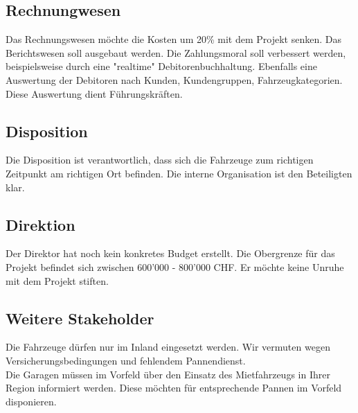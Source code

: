 \subsection{Rechnungwesen}
Das Rechnungswesen möchte die Kosten um 20\% mit dem Projekt senken. Das Berichtswesen soll ausgebaut werden. Die Zahlungsmoral soll verbessert werden, beispielsweise durch eine "realtime" Debitorenbuchhaltung. Ebenfalls eine Auswertung der Debitoren nach Kunden, Kundengruppen, Fahrzeugkategorien. Diese Auswertung dient Führungskräften. 

\subsection{Disposition}
Die Disposition ist verantwortlich, dass sich die Fahrzeuge zum richtigen Zeitpunkt am richtigen Ort befinden. Die interne Organisation ist den Beteiligten klar. 

\subsection{Direktion}
Der Direktor hat noch kein konkretes Budget erstellt. Die Obergrenze für das Projekt befindet sich zwischen 600'000 - 800'000 CHF. Er möchte keine Unruhe mit dem Projekt stiften. 

\subsection{Weitere Stakeholder}
Die Fahrzeuge dürfen nur im Inland eingesetzt werden. Wir vermuten wegen Versicherungsbedingungen und fehlendem Pannendienst. \\
Die Garagen müssen im Vorfeld über den Einsatz des Mietfahrzeugs in Ihrer Region informiert werden. Diese möchten für entsprechende Pannen im Vorfeld disponieren. \\